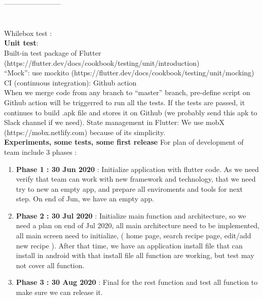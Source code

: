 \documentclass{article}
\begin{document}
       ------------------------\\ \\ \\
    Whilebox test :   \\
    \textbf{Unit test}: \\
        Built-in test package of Flutter (https://flutter.dev/docs/cookbook/testing/unit/introduction) \\
        “Mock”: use mockito (https://flutter.dev/docs/cookbook/testing/unit/mocking) \\
        CI (continuous integration): Github action \\
        When we merge code from any branch to “master” branch, pre-define script on Github action will be triggerred to run all the tests. If the tests are passed, it continues to build .apk file and stores it on Github (we probably send this apk to Slack channel if we need).
        State management in Flutter: We use mobX (https://mobx.netlify.com) because of its simplicity.\\
\textbf{Experiments, some tests, some first release} 
    For plan of development of team include 3 phases :   
    \begin{enumerate}
        \item \textbf{Phase 1 : 30 Jun 2020} : Initialize application with flutter code. As we need verify that team can work with new framework and technology, that we need try to new an empty app, and prepare all enviroments and tools for next step. On end of Jun, we have an empty app. \\
        \item \textbf{Phase 2 : 30 Jul 2020} : Initialize main function and architecture, so we need a plan on end of Jul 2020, all main architecture need to be implemented, all main screen need to initialize, ( home page, search recipe page, edit/add new recipe ). After that time, we have an application install file that can install in android with that install file all function are working, but test may not cover all function.\\
        \item \textbf{Phase 3 : 30 Aug 2020} : Final for the rest function and test all function to make sure we can release it. \\

    \end{enumerate}
\end{document}
